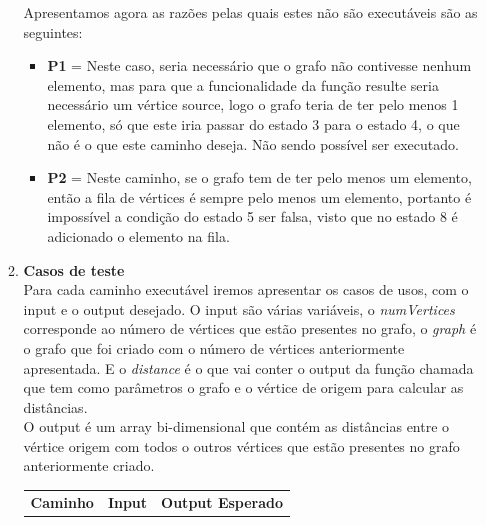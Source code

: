 \documentclass{article}
\begin{document}
\begin{itemize}
\begin{enumerate}
  \quad Apresentamos agora as razões pelas quais estes não são executáveis são as seguintes: \\
  \begin{itemize}
    \item \textbf{P1} = Neste caso, seria necessário que o grafo não contivesse nenhum elemento, mas para que a funcionalidade da função resulte seria necessário um vértice source, logo o grafo teria de ter pelo menos 1 elemento, só que este iria passar do estado 3 para o estado 4, o que não é o que este caminho deseja. Não sendo possível ser executado.\\
    \item \textbf{P2} = Neste caminho, se o grafo tem de ter pelo menos um elemento, então a fila de vértices é sempre pelo menos um elemento, portanto é impossível a condição do estado 5 ser falsa, visto que no estado 8 é adicionado o elemento na fila. 
  \end{itemize}


  \item \textbf{Casos de teste}\\
 \quad Para cada caminho executável iremos apresentar os casos de usos, com o input e o output desejado.
 O input são várias variáveis, o \textit{numVertices} corresponde ao número de vértices que estão presentes no grafo, o \textit{graph} é o grafo que foi criado com o número de vértices anteriormente apresentada. E o \textit{distance} é o que vai conter o output da função chamada que tem como parâmetros o grafo e o vértice de origem para calcular as distâncias.\\

 O output é um array bi-dimensional que contém as distâncias entre o vértice origem com todos o outros vértices que estão presentes no grafo anteriormente criado.\\


\begin{table}[H]
    \centering
    \begin{tabular}{|c|p{7cm}|p{3cm}|} %
    \hline
    \textbf{Caminho} & \textbf{Input} & \textbf{Output Esperado} \\
                        

\end{tabular}
\end{table}
\end{enumerate}
\end{itemize}
\end{document}
